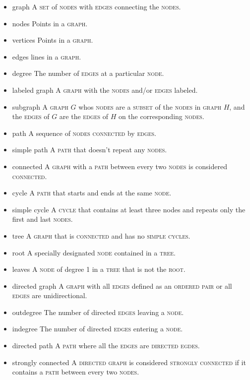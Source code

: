 \documentclass{article}
\newcommand{\term}[1]{\textsc{#1}}
\begin{document}
\bigskip \indent
\begin{itemize}
\item graph
  \subitem A \term{set} of \term{nodes} with \term{edges} connecting the \term{nodes}.
\item nodes
  \subitem Points in a \term{graph}.
\item vertices
  \subitem Points in a \term{graph}.
\item edges
  \subitem lines in a \term{graph}.
\item degree
  \subitem The number of \term{edges} at a particular \term{node}.
\item labeled graph
  \subitem A \term{graph} with the \term{nodes} and/or \term{edges} labeled.
\item subgraph
  \subitem A \term{graph} $G$ whos \term{nodes} are a \term{subset} of the \term{nodes} in \term{graph} $H$, and the \term{edges} of $G$ are the \term{edges} of $H$ on the corresponding \term{nodes}.
\item path
  \subitem A sequence of \term{nodes} \term{connected} by \term{edges}.
\item simple path
  \subitem A \term{path} that doesn't repeat any \term{nodes}.
\item connected
  \subitem A \term{graph} with a \term{path} between every two \term{nodes} is considered \term{connected}.
\item cycle
  \subitem A \term{path} that starts and ends at the same \term{node}.
\item simple cycle
  \subitem A \term{cycle} that contains at least three nodes and repeats only the first and last \term{nodes}.
\item tree
  \subitem A \term{graph} that is \term{connected} and has no \term{simple cycles}.
\item root
  \subitem A specially designated \term{node} contained in a \term{tree}.
\item leaves
  \subitem A \term{node} of degree 1 in a \term{tree} that is not the \term{root}.
\item directed graph
  \subitem A \term{graph} with all \term{edges} defined as an \term{ordered pair} or all \term{edges} are unidirectional.
\item outdegree
  \subitem The number of directed \term{edges} leaving a \term{node}.
\item indegree
  \subitem The number of directed \term{edges} entering a \term{node}.
\item directed path
  \subitem A \term{path} where all the \term{edges} are \term{directed egdes}.
\item strongly connected
  \subitem A \term{directed graph} is considered \term{strongly connected} if it contains a \term{path} between every two \term{nodes}.
\end{itemize}
   
\end{document}
